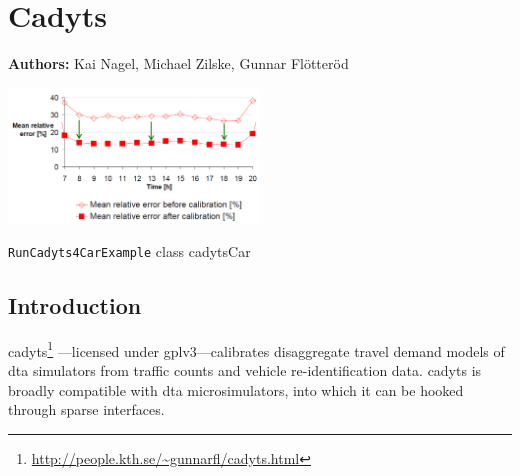 \chapter{Cadyts}
\label{ch:cadyts}

\hfill \textbf{Authors:} Kai Nagel, Michael Zilske, Gunnar Fl\"otter\"od

\begin{center} \includegraphics[width=0.5\textwidth, angle=0]{extending/figures/cadyts/cadyts} \end{center}


{\lstinline{RunCadyts4CarExample} class}
{cadytsCar}
{\citet[][]{cadyts-manual, floetteroed-2010e, FloetteroedChenEtAl2011BehavioralCalibAndAnaNETS, Floetteroed2008PhD, Moyo2013PhD}}



\section{Introduction}

\gls{cadyts}\footnote{\url{http://people.kth.se/~gunnarfl/cadyts.html}}
---licensed under \gls{gplv3}---calibrates disaggregate travel demand models 
of \gls{dta} simulators from traffic counts and vehicle re-identification data. 
\gls{cadyts} is broadly compatible with \gls{dta} microsimulators,
into which it can be hooked through sparse interfaces.

